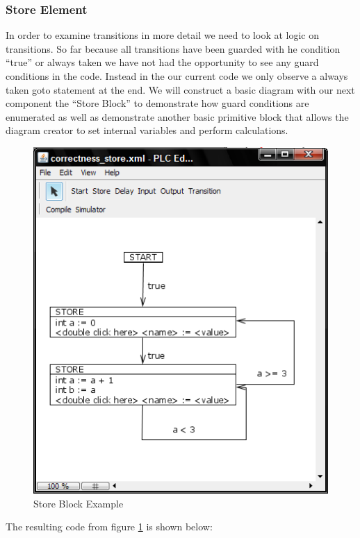 \subsubsection{Store Element}

In order to examine transitions in more detail we need to look at logic on transitions. So far because all transitions have been guarded with he condition ``true'' or always taken we have not had the opportunity to see any guard conditions in the code. Instead in the our current code we only observe a always taken goto statement at the end. We will construct a basic diagram with our next component the ``Store Block'' to demonstrate how guard conditions are enumerated as well as demonstrate another basic primitive block that allows the diagram creator to set internal variables and perform calculations.

\begin{figure}[htb]
	\centering
	\includegraphics[width=\imgmedphoto]{./images/correctness_ex_store.png}
	\caption{Store Block Example}
	\label{fig:correctness_ex_store}
\end{figure}

The resulting code from figure \ref{fig:correctness_ex_store} is shown below:


